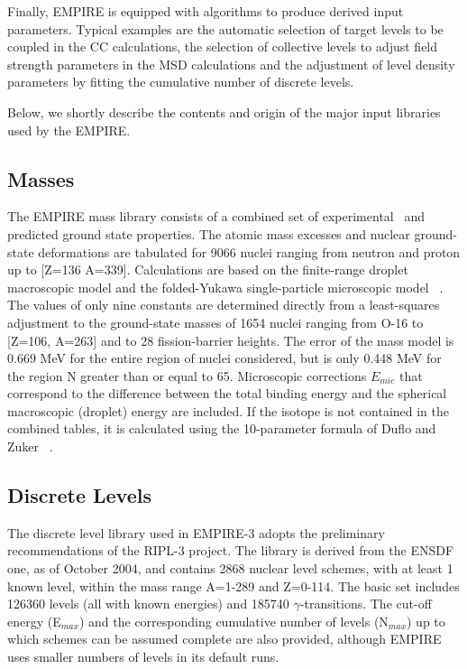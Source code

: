 Finally, EMPIRE is equipped with algorithms to produce derived input
parameters. Typical examples are the automatic selection of target levels to
be coupled in the CC calculations, the selection of collective levels to adjust
field strength parameters in the MSD calculations and the adjustment of level
density parameters by fitting the cumulative number of discrete levels.

Below, we shortly describe the contents and origin of the
major input libraries used by the EMPIRE.

\subsection{Masses}

The EMPIRE mass library consists of a
combined set of experimental~\cite{Audi} and predicted ground state
properties. The atomic mass excesses and nuclear ground-state deformations
are tabulated for 9066 nuclei ranging from neutron and proton up to {[}Z=136
A=339{]}. Calculations are based on the finite-range droplet macroscopic
model and the folded-Yukawa single-particle microscopic model~\cite{Moller95}%
. The values of only nine constants are determined directly from a
least-squares adjustment to the ground-state masses of 1654 nuclei ranging
from O-16 to {[}Z=106, A=263{]} and to 28 fission-barrier heights. The error
of the mass model is 0.669 MeV for the entire region of nuclei considered,
but is only 0.448 MeV for the region N greater than or equal to 65.
Microscopic corrections $E_{mic}$ that correspond to the difference
between the total binding energy and the spherical macroscopic (droplet)
energy are included. If the isotope is not contained in the
combined tables, it is
calculated using the 10-parameter formula of Duflo and Zuker ~\cite{Duflo:96}.

\subsection{Discrete Levels}

The discrete level library used in EMPIRE-3 adopts the preliminary
recommendations of the RIPL-3 project. The library is derived from the ENSDF
one, as of October 2004,
and contains 2868 nuclear level schemes, with at least 1
known level, within the mass range A=1-289 and Z=0-114. The basic set includes
126360 levels (all with known energies) and 185740 $\gamma$-transitions. The
cut-off energy (E$_{{max}}$) and the corresponding cumulative number of
levels (N$_{{max}}$) up to which schemes can be assumed complete are also
provided, although EMPIRE uses smaller numbers of levels in its default runs.

